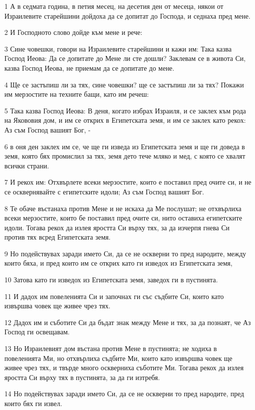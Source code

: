 \par 1 А в седмата година, в петия месец, на десетия ден от месеца, някои от Израилевите старейшини дойдоха да се допитат до Господа, и седнаха пред мене.
\par 2 И Господното слово дойде към мене и рече:
\par 3 Сине човешки, говори на Израилевите старейшини и кажи им: Така казва Господ Иеова: Да се допитате до Мене ли сте дошли? Заклевам се в живота Си, казва Господ Иеова, не приемам да се допитате до мене.
\par 4 Ще се застъпиш ли за тях, сине човешки? ще се застъпиш ли за тях? Покажи им мерзостите на техните бащи, като им речеш:
\par 5 Така казва Господ Иеова: В деня, когато избрах Израиля, и се заклех към рода на Якововия дом, и им се открих в Египетската земя, и им се заклех като рекох: Аз съм Господ вашият Бог, -
\par 6 в оня ден заклех им се, че ще ги изведа из Египетската земя и ще ги доведа в земя, която бях промислил за тях, земя дето тече мляко и мед, с която се хвалят всички страни.
\par 7 И рекох им: Отхвърлете всеки мерзостите, които е поставил пред очите си, и не се осквернявайте с египетските идоли; Аз съм Господ вашият Бог.
\par 8 Те обаче въстанаха против Мене и не искаха да Ме послушат; не отхвърлиха всеки мерзостите, които бе поставил пред очите си, нито оставиха египетските идоли. Тогава рекох да излея яростта Си върху тях, за да изчерпя гнева Си против тях всред Египетската земя.
\par 9 Но подействувах заради името Си, да се не оскверни то пред народите, между които бяха, и пред които им се открих като ги изведох из Египетската земя,
\par 10 Затова като ги изведох из Египетската земя, заведох ги в пустинята.
\par 11 И дадох им повеленията Си и започнах ги със съдбите Си, които като извършва човек ще живее чрез тях.
\par 12 Дадох им и съботите Си да бъдат знак между Мене и тях, за да познаят, че Аз Господ ги освещавам.
\par 13 Но Израилевият дом въстана против Мене в пустинята; не ходиха в повеленията Ми, но отхвърлиха съдбите Ми, които като извършва човек ще живее чрез тях, и твърде много оскверниха съботите Ми. Тогава рекох да излея яростта Си върху тях в пустинята, за да ги изтребя.
\par 14 Но подействувах заради името Си, да се не оскверни то пред народите, пред които бях ги извел.
